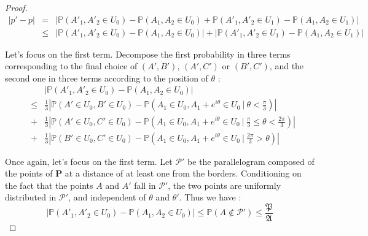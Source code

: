 \documentclass[a4paper,11pt]{article}
\theoremstyle{definition}
\theoremstyle{remark}
\begin{document}
\begin{proof}

\begin{eqnarray*}
|p' - p| 
  &=& | \mathbb{P}(A'_1 , A'_2 \in U_0) - \mathbb{P}(A_1 , A_2 \in U_0) + \mathbb{P}(A'_1 , A'_2 \in U_1) - \mathbb{P}(A_1 , A_2 \in U_1) | \\
  &\leq& | \mathbb{P}(A'_1 , A'_2 \in U_0) - \mathbb{P}(A_1 , A_2 \in U_0) | + | \mathbb{P}(A'_1 , A'_2 \in U_1) - \mathbb{P}(A_1 , A_2 \in U_1) | 
\end{eqnarray*}

Let's focus on the first term. 
Decompose the first probability in three terms corresponding to the final choice of $(A',B')$, $(A',C')$ or $(B',C')$, and the second one in three terms according to the position of $\theta$ :
\begin{eqnarray*}
& & \left| \mathbb{P}(A'_1 , A'_2 \in U_0) - \mathbb{P}(A_1 , A_2 \in U_0) \right| \\
&\leq& \frac{1}{3} \left| \mathbb{P}(A' \in U_0 , B' \in U_0) - \mathbb{P}(A_1 \in U_0 , A_1 + e^{i \theta} \in U_0 \ |\  \theta < \frac{\pi}{3} ) \right| \\
&+& \frac{1}{3} \left| \mathbb{P}(A' \in U_0 , C' \in U_0) - \mathbb{P}(A_1 \in U_0 , A_1 + e^{i \theta} \in U_0 \ |\  \frac{\pi}{3} \leq \theta < \frac{2 \pi}{3} ) \right| \\
&+& \frac{1}{3} \left| \mathbb{P}(B' \in U_0 ,C' \in U_0) - \mathbb{P}(A_1 \in U_0 , A_1 + e^{i \theta} \in U_0 \ | \  \frac{2 \pi}{3} > \theta ) \right|
\end{eqnarray*}

Once again, let's focus on the first term. Let $\mathcal{P'}$ be the parallelogram  composed of the points of  $\mathbf{P}$ at a distance of at least one from the borders. Conditioning on the fact that the points $A$ and $A'$ fall in $\mathcal{P'}$, the two points are uniformly distributed in $\mathcal{P'}$, and independent of $\theta$ and $\theta'$. Thus we have : 
$$ \left| \mathbb{P}(A'_1 , A'_2 \in U_0) - \mathbb{P}(A_1 , A_2 \in U_0) \right| \leq \mathbb P(A \not \in \mathcal{P'}) \leq \frac{\mathfrak{P}}{\mathfrak A} $$


\end{proof}
\end{document}
